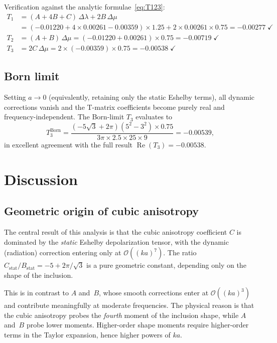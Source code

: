 \documentclass[11pt,a4paper]{article}
\newcommand{\order}[1]{\mathcal{O}\!\left(#1\right)}
\newcommand{\Dlam}{\Delta\lambda}
\newcommand{\Dmu}{\Delta\mu}
\newcommand{\re}{\operatorname{Re}}
\begin{document}
\noindent
Verification against the analytic formulae~\eqref{eq:T123}:
\begin{align*}
  T_1 &= (A + 4B + C)\,\Dlam + 2B\,\Dmu \\
  &= (-0.01220 + 4 \times 0.00261 - 0.00359) \times 1.25
     + 2 \times 0.00261 \times 0.75 = -0.00277 \;\checkmark \\
  T_2 &= (A + B)\,\Dmu
  = (-0.01220 + 0.00261) \times 0.75 = -0.00719 \;\checkmark \\
  T_3 &= 2C\,\Dmu
  = 2 \times (-0.00359) \times 0.75 = -0.00538 \;\checkmark
\end{align*}

\subsection{Born limit}

Setting $a \to 0$ (equivalently, retaining only the static
Eshelby terms), all dynamic corrections vanish and the
T-matrix coefficients become purely real and frequency-independent.
The Born-limit $T_3$ evaluates to
\begin{equation*}
  T_3^\text{Born}
  = \frac{(-5\sqrt{3} + 2\pi)(5^2 - 3^2) \times 0.75}
         {3\pi \times 2.5 \times 25 \times 9}
  = -0.00539,
\end{equation*}
in excellent agreement with the full result
$\re(T_3) = -0.00538$.

\section{Discussion}
\label{sec:discussion}

\subsection{Geometric origin of cubic anisotropy}

The central result of this analysis is that the cubic anisotropy
coefficient $C$ is dominated by the \emph{static} Eshelby
depolarization tensor, with the dynamic (radiation) correction
entering only at $\order{(ka)^7}$. The ratio
$C_\text{stat}/B_\text{stat} = -5 + 2\pi/\sqrt{3}$ is a pure
geometric constant, depending only on the shape of the inclusion.

This is in contrast to $A$ and~$B$, whose smooth corrections
enter at $\order{(ka)^3}$ and contribute meaningfully at moderate
frequencies. The physical reason is that the cubic anisotropy
probes the \emph{fourth} moment of the inclusion shape, while
$A$ and~$B$ probe lower moments. Higher-order shape moments
require higher-order terms in the Taylor expansion, hence higher
powers of $ka$.
\end{document}
